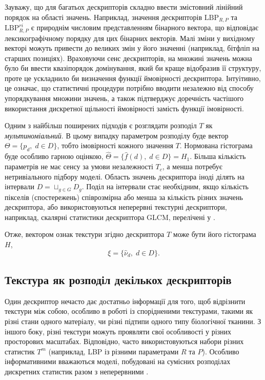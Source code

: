 Зауважу, що для багатьох дескрипторів складно ввести змістовний лінійний порядок на області значень. 
Наприклад, значення дескрипторів $\mathrm{LBP}_{R,P}$ та $\mathrm{LBP}^{ri}_{R,P}$ є природнім числовим представленням бінарного вектора, що відповідає лексикографічному порядку для цих бінарних векторів.
Малі зміни у вихідному векторі можуть привести до великих змін у його значенні (наприклад, бітфліп на старших позиціях).
Враховуючи сенс дескрипторів, на множині значень можна було би ввести квазіпорядок домінування, який би краще відобразив її структуру, проте це ускладнило би визначення функції ймовірності дескриптора.
Інтуітивно, це означає, що статистичні процедури потрібно вводити незалежно від способу упорядкування множини значень, 
а також підтверджує доречність частішого використання дискретної щільності ймовірності замість функції імовірності.

Одним з найбільш поширених підходів є розглядати розподіл $T$ як \textit{мультиноміальний}. 
В цьому випадку параметром розподілу буде вектор $\Theta = \{p_d, \; d\in D\}$, тобто імовірності кожного значення $T$.
Нормована гістограма буде особливо гарною оцінкою, $\hat \Theta = \{\hat f(d), \; d\in D\} = H_1$.
Більша кількість параметрів не має сенсу за умови незалежності $T_c$, а менша потребує нетривіального підбору моделі.
Область значень дескриптора іноді ділять на інтервали $D = \sqcup_{g\in G} D_g$.
Поділ на інтервали стає необхідним, якщо кількість пікселів (спостережень) співрозмірна або менша за кількість різних значень дескриптора, 
або використовуються неперервні текстурні дескриптори, наприклад, скалярні статистики дескриптора GLCM, перелічені у \cite{belsare2015}.

Отже, вектором ознак текстури згідно дескриптора $T$ може бути його гістограма $H$,
\begin{equation*}
    \xi = \{\hat\nu_d, \; d\in D\}.
\end{equation*}

\subsection{Текстура як розподіл декількох дескрипторів}\label{section1.2b}\hfill

Один дескриптор нечасто дає достатньо інформації для того, щоб відрізнити текстури між собою, особливо в роботі із спорідненими текстурами, 
такими як різні стани одного матеріалу, чи різні підтипи одного типу біологічної тканини.
З іншого боку, різні текстури можуть проявляти свої особливості у різних просторових масштабах.
Відповідно, часто використовуються набори різних статистик $T^m$ (наприклад, LBP із різними параметрами $R$ та $P$).
Особливо інформативними вважаються моделі, побудовані на сумісних розподілах дискретних статистик разом з неперервними \cite{guo2010lbpv}.

